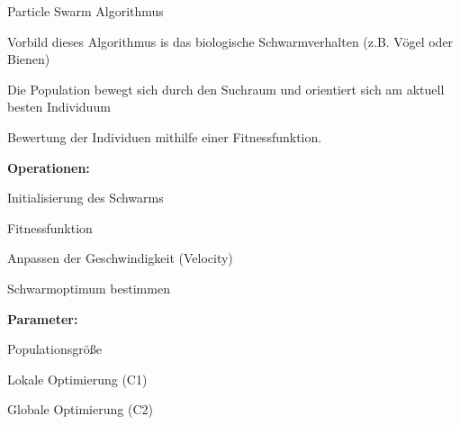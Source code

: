 \documentclass[t,8pt]{beamer}
\begin{document}
\begin{dwHeaderFrame}{Particle Swarm Algorithmus}
	\begin{dwItemize}
		\item Vorbild dieses Algorithmus is das biologische Schwarmverhalten (z.B. Vögel oder Bienen)
		\item Die Population bewegt sich durch den Suchraum und orientiert sich am aktuell besten Individuum 
		\item Bewertung der Individuen mithilfe einer Fitnessfunktion.
		\item \textbf{Operationen:}

		\begin{dwInnerItemize}
			\item Initialisierung des Schwarms
			\item Fitnessfunktion
			\item Anpassen der Geschwindigkeit (Velocity)
			\item Schwarmoptimum bestimmen
		\end{dwInnerItemize}
		\item \textbf{Parameter:}
		\begin{dwInnerItemize}
			\item Populationsgröße
			\item Lokale Optimierung (C1)
			\item Globale Optimierung (C2)
		\end{dwInnerItemize}

	\end{dwItemize}

\end{dwHeaderFrame}


\begin{dwFrame}

\end{dwFrame}
\end{document}

